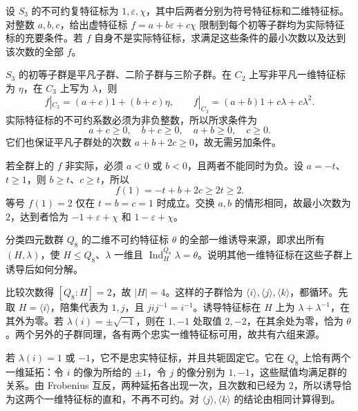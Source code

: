 \begin{exercise}\label{b5:ex:05-positive-restrictions}
	设 \(S_3\) 的不可约复特征标为 \(1,\varepsilon,\chi\)，其中后两者分别为符号特征标和二维特征标。对整数 \(a,b,c\)，给出虚特征标 \(f=a+b\varepsilon+c\chi\) 限制到每个初等子群均为实际特征标的充要条件。若 \(f\) 自身不是实际特征标，求满足这些条件的最小次数以及达到该次数的全部 \(f\)。
\end{exercise}
\begin{solution}
	\(S_3\) 的初等子群是平凡子群、二阶子群与三阶子群。在 \(C_2\) 上写非平凡一维特征标为 \(\eta\)，在 \(C_3\) 上写为 \(\lambda\)，则
	\[
		f|_{C_2}=(a+c)1+(b+c)\eta, \qquad f|_{C_3}=(a+b)1+c\lambda+c\lambda^2.
	\]
	实际特征标的不可约系数必须为非负整数，所以所求条件为
	\[
		a+c\ge0,\quad b+c\ge0,\quad a+b\ge0,\quad c\ge0.
	\]
	它们也保证平凡子群处的次数 \(a+b+2c\ge0\)，故无需另加条件。

	若全群上的 \(f\) 非实际，必须 \(a<0\) 或 \(b<0\)，且两者不能同时为负。设 \(a=-t\)、\(t\ge1\)，则 \(b\ge t\)、\(c\ge t\)，所以
	\[
		f(1)=-t+b+2c\ge2t\ge2.
	\]
	等号 \(f(1)=2\) 仅在 \(t=b=c=1\) 时成立。交换 \(a,b\) 的情形相同，故最小次数为 \(2\)，达到者恰为 \(-1+\varepsilon+\chi\) 和 \(1-\varepsilon+\chi\)。
\end{solution}

\begin{exercise}\label{b5:ex:05-quaternion-monomial}
	分类四元数群 \(Q_8\) 的二维不可约特征标 \(\theta\) 的全部一维诱导来源，即求出所有 \((H,\lambda)\)，使 \(H\le Q_8\)、\(\lambda\) 一维且 \(\operatorname{Ind}_H^{Q_8}\lambda=\theta\)。说明其他一维特征标在这些子群上诱导后如何分解。
\end{exercise}
\begin{solution}
	比较次数得 \([Q_8:H]=2\)，故 \(|H|=4\)。这样的子群恰为 \(\langle i\rangle,\langle j\rangle,\langle k\rangle\)，都循环。先取 \(H=\langle i\rangle\)，陪集代表为 \(1,j\)，且 \(jij^{-1}=i^{-1}\)。诱导特征标在 \(H\) 上为 \(\lambda+\lambda^{-1}\)，在其外为零。若 \(\lambda(i)=\pm\sqrt{-1}\)，则在 \(1,-1\) 处取值 \(2,-2\)，在其余处为零，恰为 \(\theta\)。两个另外的子群同理，各有两个忠实一维特征标可用，故共有六组来源。

	若 \(\lambda(i)=1\) 或 \(-1\)，它不是忠实特征标，并且共轭固定它。它在 \(Q_8\) 上恰有两个一维延拓：令 \(i\) 的像为所给的 \(\pm1\)，令 \(j\) 的像分别为 \(1,-1\)，这些赋值均满足群的关系。由 Frobenius 互反，两种延拓各出现一次，且次数和已经为 \(2\)，所以诱导恰为这两个一维特征标的直和，不再不可约。对 \(\langle j\rangle,\langle k\rangle\) 的结论由相同计算得到。
\end{solution}

